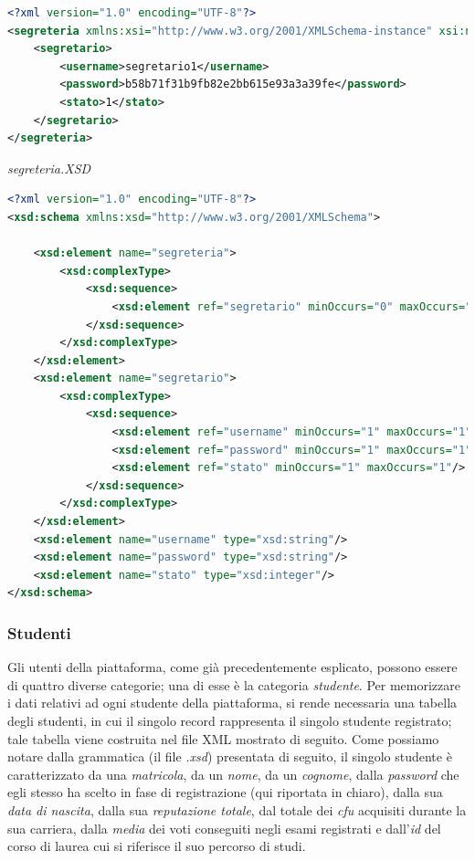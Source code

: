 \documentclass [a4paper,11pt]{book}
\begin{document}
\begin{lstlisting}[language=XML]
<?xml version="1.0" encoding="UTF-8"?>
<segreteria xmlns:xsi="http://www.w3.org/2001/XMLSchema-instance" xsi:noNamespaceSchemaLocation="segreteria.xsd">
    <segretario>
        <username>segretario1</username>
        <password>b58b71f31b9fb82e2bb615e93a3a39fe</password>
        <stato>1</stato>
    </segretario>
</segreteria>
\end{lstlisting}

\emph{segreteria.XSD}

\begin{lstlisting}[language=XML]
<?xml version="1.0" encoding="UTF-8"?>
<xsd:schema xmlns:xsd="http://www.w3.org/2001/XMLSchema">

    <xsd:element name="segreteria">
        <xsd:complexType>
            <xsd:sequence>
                <xsd:element ref="segretario" minOccurs="0" maxOccurs="unbounded" />
            </xsd:sequence>
        </xsd:complexType>
    </xsd:element>
    <xsd:element name="segretario">
        <xsd:complexType>
            <xsd:sequence>
                <xsd:element ref="username" minOccurs="1" maxOccurs="1"/>
                <xsd:element ref="password" minOccurs="1" maxOccurs="1"/>
                <xsd:element ref="stato" minOccurs="1" maxOccurs="1"/>
            </xsd:sequence>
        </xsd:complexType>
    </xsd:element>
    <xsd:element name="username" type="xsd:string"/>
    <xsd:element name="password" type="xsd:string"/>
    <xsd:element name="stato" type="xsd:integer"/>
</xsd:schema>
\end{lstlisting}

\medskip

\subsubsection{Studenti}	%

Gli utenti della piattaforma, come già precedentemente esplicato, possono essere di quattro diverse categorie; una di esse è la categoria \emph{studente}. Per memorizzare i dati relativi ad ogni studente della piattaforma, si rende necessaria una tabella degli studenti, in cui il singolo record rappresenta il singolo studente registrato; tale tabella viene costruita nel file XML mostrato di seguito. Come possiamo notare dalla grammatica (il file \emph{.xsd}) presentata di seguito, il singolo studente è caratterizzato da una \emph{matricola}, da un \emph{nome}, da un \emph{cognome}, dalla \emph{password} che egli stesso ha scelto in fase di registrazione (qui riportata in chiaro), dalla sua \emph{data di nascita}, dalla sua \emph{reputazione totale}, dal totale dei \emph{cfu} acquisiti durante la sua carriera, dalla \emph{media} dei voti conseguiti negli esami registrati e dall'\emph{id} del corso di laurea cui si riferisce il suo percorso di studi.
\end{document}
